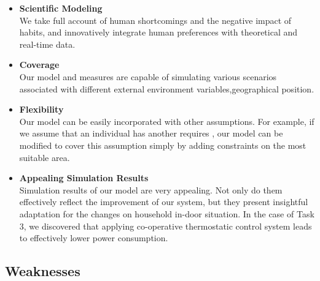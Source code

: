 \documentclass{mcmthesis}
\begin{document}
			\begin{itemize}
				
				\item \textbf{Scientific Modeling}\\
				We take full account of human shortcomings and the negative impact of habits, and innovatively integrate human preferences with theoretical and real-time data.
				
				\item \textbf{Coverage}\\
				Our model and measures are capable of simulating various scenarios associated with different external environment variables,geographical position.
				
				\item \textbf{Flexibility}\\
				Our model can be easily incorporated with other assumptions. For example, if we assume that an individual has another requires , our model can be modified to cover this assumption simply by adding constraints on the most suitable area.
				
				\item \textbf{Appealing Simulation Results}\\
				Simulation results of our model are very appealing.
				Not only do them effectively reflect the improvement of our system, but they present insightful adaptation for the changes on  household in-door situation. 
				In the case of Task 3, we discovered that applying co-operative thermostatic control system leads to effectively lower power consumption.
		
			\end{itemize}
		
		\subsection{Weaknesses}
		
\end{document}
